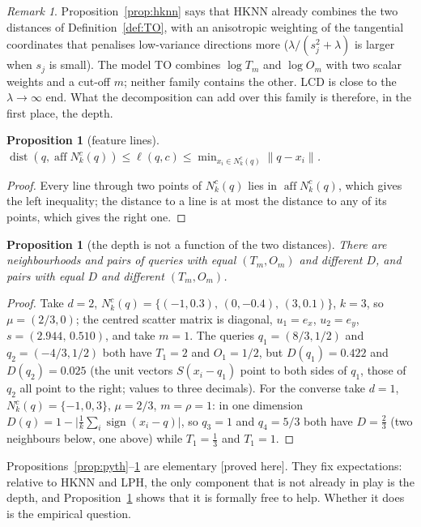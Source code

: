 \documentclass[10pt,a4paper]{article}
\theoremstyle{plain}
\newtheorem{proposition}[theorem]{Proposition}
\theoremstyle{definition}
\theoremstyle{remark}
\newtheorem{remark}[theorem]{Remark}
\newcommand{\Nk}{N_k^{c}(q)}
\newcommand{\aff}{\operatorname{aff}}
\newcommand{\dist}{\operatorname{dist}}
\newcommand{\status}[1]{\textsf{\small [#1]}}
\newcommand{\meth}[1]{\textsf{#1}}
\begin{document}
\begin{remark}\label{rem:family}
Proposition~\ref{prop:hknn} says that HKNN already combines the two distances of Definition~\ref{def:TO}, with an anisotropic weighting of the tangential coordinates that penalises low-variance directions more ($\lambda/(s_j^2+\lambda)$ is larger when $s_j$ is small). The model \meth{TO} combines $\log T_m$ and $\log O_m$ with two scalar weights and a cut-off $m$; neither family contains the other. \meth{LCD} is close to the $\lambda\to\infty$ end. What the decomposition can add over this family is therefore, in the first place, the depth.
\end{remark}

\begin{proposition}[feature lines]\label{prop:nfl}
$\dist(q,\aff\Nk)\le\ell(q,c)\le\min_{x_i\in\Nk}\|q-x_i\|$.
\end{proposition}
\begin{proof}
Every line through two points of $\Nk$ lies in $\aff\Nk$, which gives the left inequality; the distance to a line is at most the distance to any of its points, which gives the right one.
\end{proof}

\begin{proposition}[the depth is not a function of the two distances]\label{prop:nonredundant}
There are neighbourhoods and pairs of queries with equal $(T_m,O_m)$ and different $D$, and pairs with equal $D$ and different $(T_m,O_m)$.
\end{proposition}
\begin{proof}
Take $d=2$, $\Nk=\{(-1,0.3),\,(0,-0.4),\,(3,0.1)\}$, $k=3$, so $\mu=(2/3,0)$; the centred scatter matrix is diagonal, $u_1=e_x$, $u_2=e_y$, $s=(2.944,\,0.510)$, and take $m=1$. The queries $q_1=(8/3,1/2)$ and $q_2=(-4/3,1/2)$ both have $T_1=2$ and $O_1=1/2$, but $D(q_1)=0.422$ and $D(q_2)=0.025$ (the unit vectors $S(x_i-q_1)$ point to both sides of $q_1$, those of $q_2$ all point to the right; values to three decimals). For the converse take $d=1$, $\Nk=\{-1,0,3\}$, $\mu=2/3$, $m=\rho=1$: in one dimension $D(q)=1-\big|\frac1k\sum_i\operatorname{sign}(x_i-q)\big|$, so $q_3=1$ and $q_4=5/3$ both have $D=\tfrac23$ (two neighbours below, one above) while $T_1=\tfrac13$ and $T_1=1$.
\end{proof}

Propositions~\ref{prop:pyth}--\ref{prop:nonredundant} are elementary \status{proved here}. They fix expectations: relative to HKNN and LPH, the only component that is not already in play is the depth, and Proposition~\ref{prop:nonredundant} shows that it is formally free to help. Whether it does is the empirical question.
\end{document}
